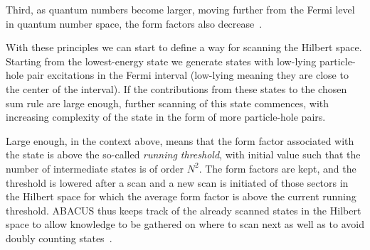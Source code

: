\documentclass[11pt, a4paper]{report} %
\begin{document}
Third, as quantum numbers become larger, moving further from the Fermi level in quantum number space, the form factors also decrease~\cite{Caux2009}.

With these principles we can start to define a way for scanning the Hilbert space.
Starting from the lowest-energy state we generate states with low-lying particle-hole pair excitations in the Fermi interval (low-lying meaning they are close to the center of the interval).
If the contributions from these states to the chosen sum rule are large enough, further scanning of this state commences, with increasing complexity of the state in the form of more particle-hole pairs.

Large enough, in the context above, means that the form factor associated with the state is above the so-called \textit{running threshold}, with initial value such that the number of intermediate states is of order \(N^2\).
The form factors are kept, and the threshold is lowered after a scan and a new scan is initiated of those sectors in the Hilbert space for which the average form factor is above the current running threshold.
ABACUS thus keeps track of the already scanned states in the Hilbert space to allow knowledge to be gathered on where to scan next as well as to avoid doubly counting states~\cite{Caux2009}.
\end{document}
